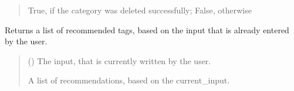 \documentclass[letterpaper,10pt,english]{sphinxmanual}
\begin{document}
\begin{fulllineitems}
\begin{fulllineitems}
\begin{quote}
\begin{description}
\sphinxAtStartPar
True, if the category was deleted successfully; False, otherwise

\sphinxAtStartPar
{}

\end{description}\end{quote}

\end{fulllineitems}


\begin{fulllineitems}
\label{\detokenize{apidoc/src.osm_configurator.control:src.osm_configurator.control.category_controller.CategoryController.get_list_of_tag_recommendations}}
\pysigstartsignatures
{}
\pysigstopsignatures
\sphinxAtStartPar
Returns a list of recommended tags, based on the input that is already entered by the user.
\begin{quote}\begin{description}
\sphinxAtStartPar
{} () \textendash{} The input, that is currently written by the user.

\sphinxAtStartPar
A list of recommendations, based on the current\_input.

\sphinxAtStartPar
\sphinxhref{https://docs.python.org/3.11/library/stdtypes.html\#list}{list}{[}\sphinxhref{https://docs.python.org/3.11/library/stdtypes.html\#str}{str}{]}

\end{description}\end{quote}

\end{fulllineitems}



\end{fulllineitems}
\end{document}
